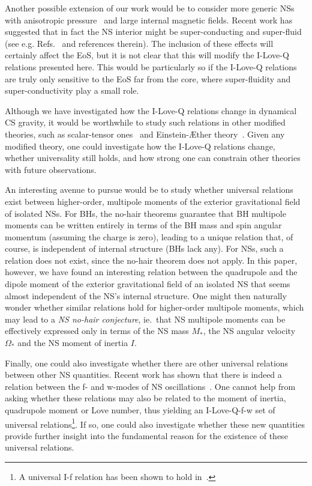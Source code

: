 \documentclass[aps,twocolumn,nofootinbib,showpacs,superscriptaddress,hyperref]{revtex4-1}
\newcommand{\NS}{*}
\begin{document}
Another possible extension of our work would be to consider more generic NSs with anisotropic pressure~\cite{doneva} and large internal magnetic fields. Recent work has suggested that in fact the NS interior might be super-conducting and super-fluid (see e.g. Refs.~\cite{link1,link2} and references therein). The inclusion of these effects will certainly affect the EoS, but it is not clear that this will modify the I-Love-Q relations presented here. This would be particularly so if the I-Love-Q relations are truly only sensitive to the EoS far from the core, where super-fluidity and super-conductivity play a small role. 

Although we have investigated how the I-Love-Q relations change in dynamical CS gravity, it would be worthwhile to study such relations in other modified theories, such as scalar-tensor ones~\cite{fujii} and Einstein-\AE ther theory~\cite{AE-review}. Given any modified theory, one could investigate how the I-Love-Q relations change, whether universality still holds, and how strong one can constrain other theories with future observations. 

An interesting avenue to pursue would be to study whether universal relations exist between higher-order, multipole moments of the exterior gravitational field of isolated NSs. For BHs, the no-hair theorems guarantee that BH multipole moments can be written entirely in terms of the BH mass and spin angular momentum (assuming the charge is zero), leading to a unique relation that, of course, is independent of internal structure (BHs lack any). For NSs, such a relation does not exist, since the no-hair theorem does not apply. In this paper, however, we have found an interesting relation between the quadrupole and the dipole moment of the exterior gravitational field of an isolated NS that seems almost independent of the NS's internal structure. One might then naturally wonder whether similar relations hold for higher-order multipole moments, which may lead to a \emph{NS no-hair conjecture}, ie.~that NS multipole moments can be effectively expressed only in terms of the NS mass $M_\NS$, the NS angular velocity $\Omega_\NS$ and the NS moment of inertia $I$.

Finally, one could also investigate whether there are other universal relations between other NS quantities. Recent work has shown that there is indeed a relation between the f- and w-modes of NS oscillations~\cite{andersson-kokkotas,tsui-leung,lau}. One cannot help from asking whether these relations may also be related to the moment of inertia, quadrupole moment or Love number, thus yielding an I-Love-Q-f-w set of universal relations\footnote{A universal I-f relation has been shown to hold in~\cite{lau}.}. If so, one could also investigate whether these new quantities provide further insight into the fundamental reason for the existence of these universal relations. 
\end{document}
